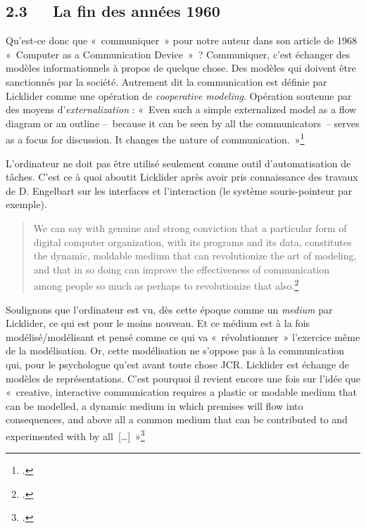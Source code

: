 \documentclass{FramateX}
\begin{document}
\begin{refsection}
\subsection*{2.3~~~La fin des années 1960}
{}

Qu'est-ce donc que «~communiquer~» pour notre auteur dans son article de
1968 «~Computer as a Communication Device~»~? Communiquer, c'est échanger des
modèles informationnels à propos de quelque chose. Des modèles qui
doivent être sanctionnés par la société. Autrement dit la communication
est définie par Licklider comme une opération de \textit{cooperative modeling}. Opération soutenue par des moyens d'\textit{externalization} : «~Even such a simple externalized model as a flow diagram or an outline --~because it can be seen by all the communicators~-- serves as a focus for
discussion. It changes the nature of communication.~»\footnote{\cite[p.~22-23]{licklidercomputer1968}.}


L'ordinateur ne doit pas être utilisé seulement comme outil
d'automatisation de tâches. C'est ce à quoi aboutit Licklider après
avoir pris connaissance des travaux de D. Engelbart sur les interfaces
et l'interaction (le système souris-pointeur par exemple). 

\begin{quote}
We can say
with genuine and strong conviction that a particular form of digital
computer organization, with its programs and its data, constitutes the
dynamic, moldable medium that can revolutionize the art of modeling,
and that in so doing can improve the effectiveness of communication
among people so much as perhaps to revolutionize that also.\footnote{\cite[p.~27]{licklidercomputer1968}.}
\end{quote}

Soulignons que l'ordinateur est vu, dès cette époque comme un \textit{medium}
par Licklider, ce qui est pour le moins nouveau. Et ce médium est à la
fois modélisé/modélisant et pensé comme ce qui va «~révolutionner~»
l'exercice même de la modélisation. Or, cette modélisation ne s'oppose
pas à la communication qui, pour le psychologue qu'est avant toute
chose JCR. Licklider est échange de modèles de représentations. C'est
pourquoi il revient encore une fois sur l'idée que «~creative,
interactive communication requires a plastic or modable medium that can
be modelled, a dynamic medium in which premises will flow into
consequences, and above all a common medium that can be contributed to
and experimented with by all~[\ldots]~»\footnote{\cite[p.~22]{licklidercomputer1968}.}



\end{refsection}
\end{document}
